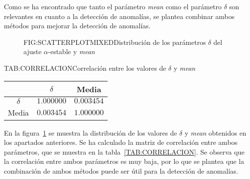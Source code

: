 Como se ha encontrado que tanto el parámetro \textit{mean} como el parámetro $\delta$ son relevantes en cuanto a la detección de anomalías, se plantea combinar ambos métodos para mejorar la detección de anomalías.

\begin{figure}[Distribución de los parámetros $\delta$ del ajuste $\alpha$-estable y \textit{mean}]{FIG:SCATTERPLOTMIXED}{Distribución de los parámetros $\delta$ del ajuste $\alpha$-estable y \textit{mean}}
    \label{FIG:SCATTERPLOTMIXED}
\end{figure}


\begin{table}[Correlación entre los valores de $\delta$ y \textit{mean}]{TAB:CORRELACION}{Correlación entre los valores de $\delta$ y \textit{mean}}
    \begin{tabular}{|c|c|c|}
        \hline
        & $\delta$ & Media \\
        \hline
        $\delta$ & $1.000000$ & $0.003454$ \\
        Media & $0.003454$ & $1.000000$ \\
        \hline
    \end{tabular}
\end{table}

En la figura~\ref{FIG:SCATTERPLOTMIXED} se muestra la distribución de los valores de $\delta$ y \textit{mean} obtenidos en los apartados anteriores. Se ha calculado la matriz de correlación entre ambos parámetros, que se muestra en la tabla~\ref{TAB:CORRELACION}. Se observa que la correlación entre ambos parámetros es muy baja, por lo que se plantea que la combinación de ambos métodos puede ser útil para la detección de anomalías.